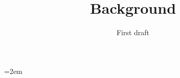 \documentclass[a4paper,english]{report}
\begin{document}
\title{Background}
\subtitle{First draft}

\maketitle



\newpage
\emergencystretch=2em
\printbibliography
\end{document}
